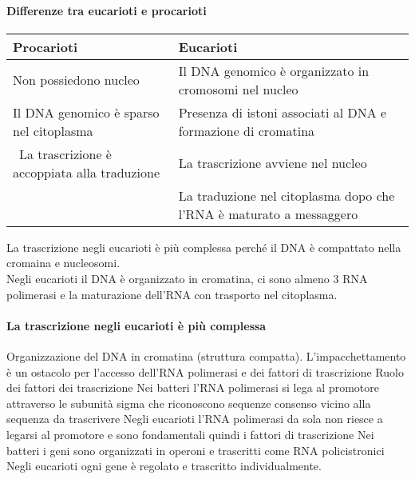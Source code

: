 \documentclass{article}
\begin{document}
\paragraph{Differenze tra eucarioti e procarioti}
\begin{center}
    \begin{tabular}{ll}
        \toprule
        Procarioti & Eucarioti \\
        \midrule
        Non possiedono nucleo & Il DNA genomico è organizzato in cromosomi nel nucleo\\
        Il DNA genomico è sparso nel citoplasma & Presenza di istoni associati al DNA e formazione di cromatina \\\
        La trascrizione è accoppiata alla traduzione & La trascrizione avviene nel nucleo \\
        & La traduzione nel citoplasma dopo che l'RNA è maturato a messaggero\\
        \bottomrule
    \end{tabular}
\end{center}
La trascrizione negli eucarioti è più complessa perché il DNA è compattato nella cromaina e nucleosomi.\\
Negli eucarioti il DNA è organizzato in cromatina, ci sono almeno 3 RNA polimerasi e la maturazione dell'RNA con trasporto nel citoplasma.\\
\paragraph{La trascrizione negli eucarioti è più complessa}
Organizzazione del DNA in cromatina (struttura compatta). L'impacchettamento
è un ostacolo per l'accesso dell'RNA polimerasi e dei fattori di trascrizione
Ruolo dei fattori dei trascrizione
Nei batteri l'RNA polimerasi si lega al promotore attraverso le subunità sigma che
riconoscono sequenze consenso vicino alla sequenza da trascrivere
Negli eucarioti l'RNA polimerasi da sola non riesce a legarsi al promotore e sono
fondamentali quindi i fattori di trascrizione
Nei batteri i geni sono organizzati in operoni e trascritti come RNA policistronici
Negli eucarioti ogni gene è regolato e trascritto individualmente.
\end{document}
